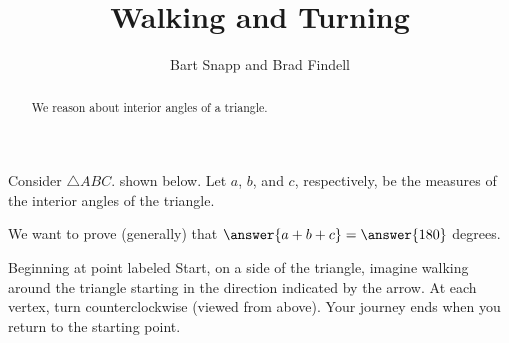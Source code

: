 \documentclass[nooutcomes,noauthor]{ximera}
\title{Walking and Turning}
\author{Bart Snapp and Brad Findell}
\begin{document}
\begin{abstract}
  We reason about interior angles of a triangle.
\end{abstract}
\maketitle


\begin{problem}
Consider $\triangle ABC$. shown below.  Let $a$, $b$, and $c$, respectively, be the measures of the interior angles of the triangle.  

We want to prove (generally) that $\answer{a+b+c}=\answer{180}$ degrees. 

\begin{center}  
\end{center}



Beginning at point labeled Start, on a side of the triangle, imagine walking around the triangle starting in the direction indicated by the arrow.  At each vertex, turn counterclockwise (viewed from above).  Your journey ends when you return to the starting point.  



\end{problem}
\end{document}
